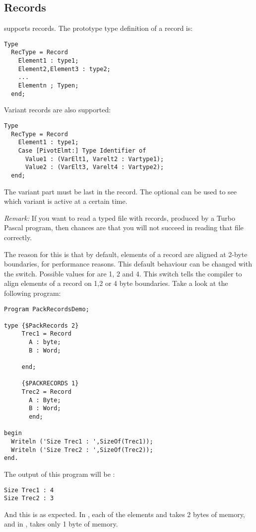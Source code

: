 \documentclass{report}
\begin{document}
\subsection{Records}

\fpk supports records. The prototype type definition of a record is:
\begin{verbatim}
Type
  RecType = Record
    Element1 : type1;
    Element2,Element3 : type2;
    ...
    Elementn ; Typen;
  end;
\end{verbatim}
Variant records are also supported:
\begin{verbatim}
Type
  RecType = Record
    Element1 : type1;
    Case [PivotElmt:] Type Identifier of
      Value1 : (VarElt1, Varelt2 : Vartype1);
      Value2 : (VarElt3, Varelt4 : Vartype2);
  end;
\end{verbatim}
The variant part must be last in the record. The optional 
can be used to see which variant is active at a certain time.

{\em Remark:} If you want to read a typed file with records, produced by
a Turbo Pascal program, then chances are that you will not succeed in
reading that file correctly. 

The reason for this is that by default, elements of a record are aligned at
2-byte boundaries, for performance reasons. This default behaviour can be
changed with the  switch. Possible values for
 are 1, 2 and 4. This switch tells the compiler to align elements of
a record on 1,2 or 4 byte boundaries. Take a look at the following program:
\begin{CodEx}
\begin{verbatim}
Program PackRecordsDemo;

type {$PackRecords 2}
     Trec1 = Record
       A : byte;
       B : Word;
       
     end;
     
     {$PACKRECORDS 1}
     Trec2 = Record
       A : Byte;
       B : Word;
       end;

begin
  Writeln ('Size Trec1 : ',SizeOf(Trec1));
  Writeln ('Size Trec2 : ',SizeOf(Trec2));
end.
\end{verbatim}
\end{CodEx}
The output of this program will be :
\begin{verbatim}
Size Trec1 : 4
Size Trec2 : 3
\end{verbatim}
And this is as expected. In , each of the elements  and
 takes 2 bytes of memory, and in  ,  takes only 1
byte of memory.
\end{document}
